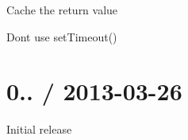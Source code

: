 
\begin{DoxyItemize}
\item Cache the return value
\item Don\textquotesingle{}t use {\ttfamily set\+Timeout()}
\end{DoxyItemize}

\section*{0.. / 2013-\/03-\/26 }


\begin{DoxyItemize}
\item Initial release 
\end{DoxyItemize}
